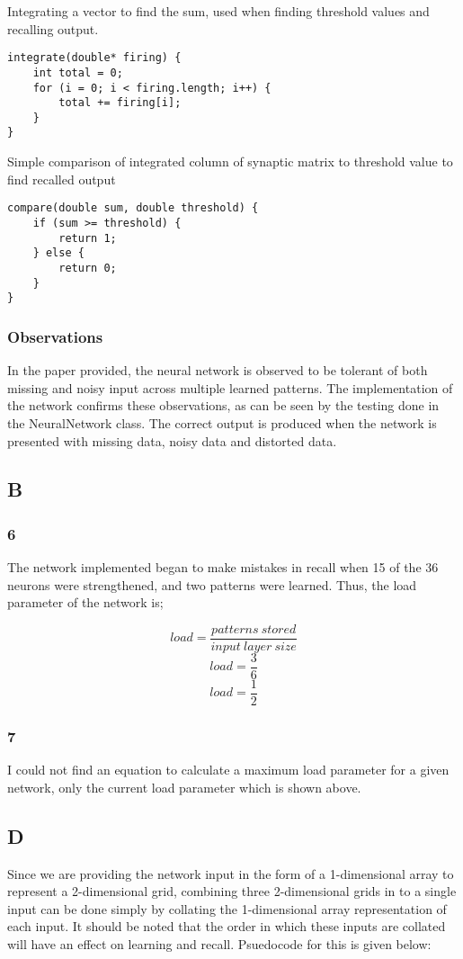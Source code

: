 \documentclass{article}
\begin{document}
Integrating a vector to find the sum, used when finding threshold values and recalling output.
\begin{lstlisting}
integrate(double* firing) {
	int total = 0;
	for (i = 0; i < firing.length; i++) {
		total += firing[i];
	}
}
\end{lstlisting}

Simple comparison of integrated column of synaptic matrix to threshold value to find recalled output
\begin{lstlisting}
compare(double sum, double threshold) {
	if (sum >= threshold) {
		return 1;
	} else {
		return 0;
	}
}
\end{lstlisting}

\subsubsection*{Observations}
In the paper provided, the neural network is observed to be tolerant of both missing and noisy input across multiple learned patterns. The implementation of the network confirms these observations, as can be seen by the testing done in the NeuralNetwork class. The correct output is produced when the network is presented with missing data, noisy data and distorted data. 

\subsection*{B}
\subsubsection*{6}
The network implemented began to make mistakes in recall when 15 of the 36 neurons were strengthened, and two patterns were learned. Thus, the load parameter of the network is;

\[load = \frac{patterns\ stored}{input\ layer\ size}\]
\[load = \frac{3}{6}\]
\[load = \frac{1}{2}\]

\subsubsection*{7}
I could not find an equation to calculate a maximum load parameter for a given network, only the current load parameter which is shown above.

\newpage
\subsection*{D}
Since we are providing the network input in the form of a 1-dimensional array to represent a 2-dimensional grid, combining three 2-dimensional grids in to a single input can be done simply by collating the 1-dimensional array representation of each input. It should be noted that the order in which these inputs are collated will have an effect on learning and recall. Psuedocode for this is given below:
\end{document}
